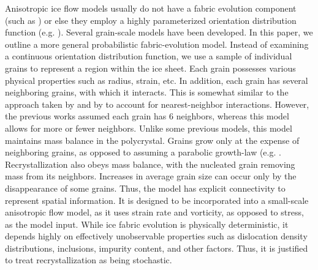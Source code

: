 \documentclass{igs}
\begin{document}
Anisotropic ice flow models usually do not have a fabric evolution component (such as \citet{pettit2007}) or else they employ a highly parameterized orientation distribution function (e.g. \citet{gillet2006}). Several grain-scale models have been developed. In this paper, we outline a more general probabilistic fabric-evolution model. Instead of examining a continuous orientation distribution function, we use a sample of individual grains to represent a region within the ice sheet. Each grain possesses various physical properties such as radius, strain, etc. In addition, each grain has several neighboring grains, with which it interacts. This is somewhat similar to the approach taken by \citet{thorsteinsson2002nni} and by \citet{kennedy} to account for nearest-neighbor interactions. However, the previous works assumed each grain has 6 neighbors, whereas this model allows for more or fewer neighbors. Unlike some previous models, this model maintains mass balance in the polycrystal. Grains grow only at the expense of neighboring grains, as opposed to assuming a parabolic growth-law (e.g. \citet{gow1969}. Recrystallization also obeys mass balance, with the nucleated grain removing mass from its neighbors. Increases in average grain size can occur only by the disappearance of some grains. Thus, the model has explicit connectivity to represent spatial information. It is designed to be incorporated into a small-scale anisotropic flow model, as it uses strain rate and vorticity, as opposed to stress, as the model input. While ice fabric evolution is physically deterministic, it depends highly on effectively unobservable properties such as dislocation density distributions, inclusions, impurity content, and other factors. Thus, it is justified to treat recrystallization as being stochastic. 
\end{document}
